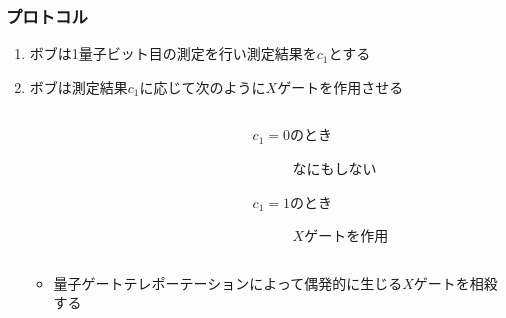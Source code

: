 \begin{frame}
  \frametitle{プロトコル}

  \begin{enumerate}
    \item ボブは1量子ビット目の測定を行い測定結果を$c_1$とする
    \begin{figure}
    \end{figure}

    \item ボブは測定結果$c_1$に応じて次のように$X$ゲートを作用させる
    \begin{columns}
      \begin{column}{0.4\textwidth}
        \begin{figure}
        \end{figure}
      \end{column}
      \begin{column}{0.4\textwidth}
        \begin{description}
          \item[$c_1 = 0$のとき] なにもしない
          \item[$c_1 = 1$のとき] $X$ゲートを作用
        \end{description}
      \end{column}
    \end{columns}
    \begin{itemize}
      \item 量子ゲートテレポーテーションによって偶発的に生じる$X$ゲートを相殺する
    \end{itemize}
  \end{enumerate}
\end{frame}

